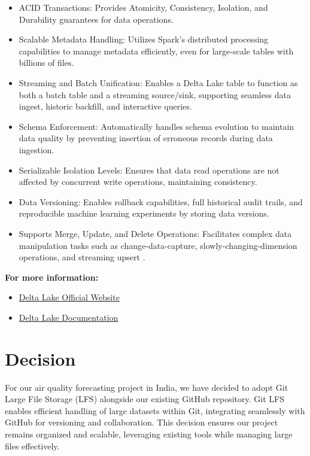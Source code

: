 \begin{itemize}
	\item ACID Transactions: Provides Atomicity, Consistency, Isolation, and Durability
	guarantees for data operations.
	
	\item Scalable Metadata Handling: Utilizes Spark's distributed processing
	capabilities to manage metadata efficiently, even for large-scale tables with
	billions of files.
	
	\item Streaming and Batch Unification: Enables a Delta Lake table to function
	as both a batch table and a streaming source/sink, supporting seamless data ingest,
	historic backfill, and interactive queries.
	
	\item Schema Enforcement: Automatically handles schema evolution to maintain
	data quality by preventing insertion of erroneous records during data
	ingestion.
	
	\item Serializable Isolation Levels: Ensures that data read operations are not
	affected by concurrent write operations, maintaining consistency.
	
	\item Data Versioning: Enables rollback capabilities, full historical audit trails,
	and reproducible machine learning experiments by storing data versions.
	
	\item Supports Merge, Update, and Delete Operations: Facilitates complex data
	manipulation tasks such as change-data-capture, slowly-changing-dimension operations,
	and streaming upsert \cite{DVCTools:2023}.
\end{itemize}

\textbf{For more information:}
\begin{itemize}
	\item \href{https://delta.io/}{Delta Lake Official Website}
	
	\item \href{https://docs.delta.io/latest/index.html}{Delta Lake Documentation}
\end{itemize}

\section{Decision}

For our air quality forecasting project in India, we have decided to adopt Git
Large File Storage (LFS) alongside our existing GitHub repository. Git LFS enables
efficient handling of large datasets within Git, integrating seamlessly with
GitHub for versioning and collaboration. This decision ensures our project remains
organized and scalable, leveraging existing tools while managing large files
effectively.